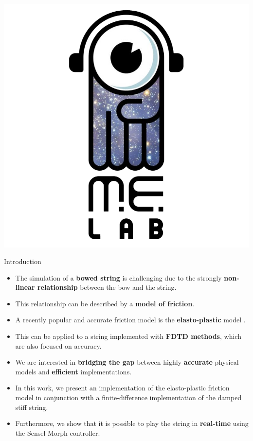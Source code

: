 \documentclass[a0paper,portrait]{baposter}
\let\oldbf\textbf
\renewcommand{\textbf}[1]{\textcolor{aaublue1}{\oldbf{#1}}}
\begin{document}
\begin{poster}
{  \includegraphics[height=0.75\headerheight]{melablogo.png}
}


\begin{posterbox}[name=intro,column=0,row=0]{Introduction}
\begin{itemize}
    \item The simulation of a \textbf{bowed string} is challenging due to the strongly \textbf{non-linear relationship} between the bow and the string.
    \item This relationship can be described by a \textbf{model of friction}.
    \item A recently popular and accurate friction model is the \textbf{elasto-plastic} model \cite{Dupont2002}.
    \item This can be applied to a string implemented with \textbf{FDTD methods}, which are also focused on accuracy. 
    \item We are interested in \textbf{bridging the gap} between highly \textbf{accurate} physical models and \textbf{efficient} implementations. \item In this work, we present an implementation of the elasto-plastic friction model in conjunction with a finite-difference implementation of the damped stiff string. 
    \item Furthermore, we show that it is possible to play the string in \textbf{real-time} using the Sensel Morph controller.
\end{itemize}
\end{posterbox}


\end{poster}
\end{document}
